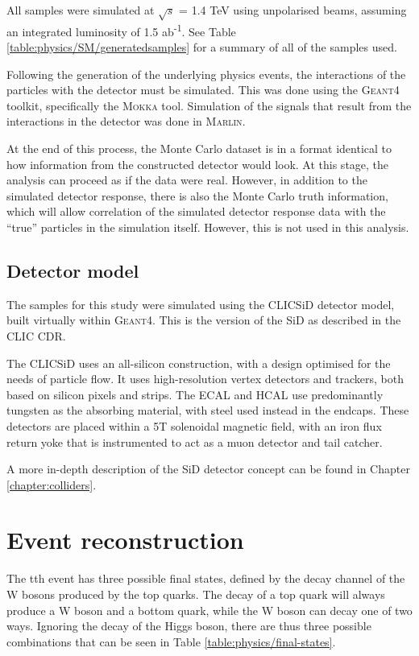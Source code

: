 All samples were simulated at $\sqrt{s}$ = 1.4 TeV using unpolarised beams, assuming an integrated luminosity of 1.5 ab\textsuperscript{-1}. See Table \ref{table:physics/SM/generatedsamples} for a summary of all of the samples used. 

Following the generation of the underlying physics events, the interactions of the particles with the detector must be simulated. This was done using the \textsc{Geant4} toolkit\cite{geant4}, specifically the \textsc{Mokka} tool. Simulation of the signals that result from the interactions in the detector was done in \textsc{Marlin}\cite{marlin}.

At the end of this process, the Monte Carlo dataset is in a format identical to how information from the constructed detector would look. At this stage, the analysis can proceed as if the data were real. However, in addition to the simulated detector response, there is also the Monte Carlo truth information, which will allow correlation of the simulated detector response data with the ``true'' particles in the simulation itself. However, this is not used in this analysis.

\subsection{Detector model}
The samples for this study were simulated using the CLIC\textunderscore SiD detector model, built virtually within \textsc{Geant4}\cite{clic-sid-geant4}. This is the version of the \acrfull{SiD} as described in the \acrlong{CLIC} \acrfull{CDR}.

The CLIC\textunderscore SiD uses an all-silicon construction, with a design optimised for the needs of particle flow. It uses high-resolution vertex detectors and trackers, both based on silicon pixels and strips. The \acrshort{ECAL} and \acrshort{HCAL} use predominantly tungsten as the absorbing material, with steel used instead in the endcaps. These detectors are placed within a 5T solenoidal magnetic field, with an iron flux return yoke that is instrumented to act as a muon detector and tail catcher.

A more in-depth description of the \acrshort{SiD} detector concept can be found in Chapter \ref{chapter:colliders}.

\section{Event reconstruction}
The tth event has three possible final states, defined by the decay channel of the W bosons produced by the top quarks. The decay of a top quark will always produce a W boson and a bottom quark, while the W boson can decay one of two ways. Ignoring the decay of the Higgs boson, there are thus three possible combinations that can be seen in Table \ref{table:physics/final-states}. \\

